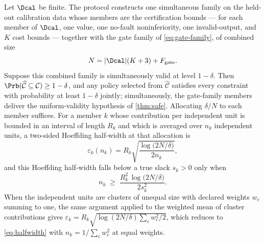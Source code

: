 \begin{proposition}
\label{prop:certification}
Let $\Dcal$ be finite.  The protocol constructs one simultaneous family on the
held-out calibration data whose members are the certification bounds --- for
each member of $\Dcal$, one value, one no-fault noninferiority, one
invalid-output, and $K$ cost bounds --- together with the gate family of
\cref{eq:gate-family}, of combined size
\begin{equation}
 N=|\Dcal|(K+3)+F_{\mathrm{gate}} .
 \label{eq:combined-family}
\end{equation}
Suppose this combined family is simultaneously valid at level $1-\delta$.  Then
$\Prb(\widehat{\mathcal C}\subseteq\mathcal C)\ge 1-\delta$, and any policy
selected from $\widehat{\mathcal C}$ satisfies every constraint with probability
at least $1-\delta$ jointly; simultaneously, the gate-family members deliver the
uniform-validity hypothesis of \cref{thm:safe}.  Allocating $\delta/N$ to each
member suffices.  For a member $k$ whose contribution per independent unit is
bounded in an interval of length $R_k$ and which is averaged over $n_k$
independent units, a two-sided Hoeffding half-width at that allocation is
\begin{equation}
 \varepsilon_k(n_k)=R_k\sqrt{\frac{\log\!\big(2N/\delta\big)}{2n_k}},
 \label{eq:halfwidth}
\end{equation}
and this Hoeffding half-width falls below a true slack $s_k>0$ only when
\begin{equation}
 n_k\;\ge\;\frac{R_k^{2}\,\log\!\big(2N/\delta\big)}{2s_k^{2}} .
 \label{eq:sample-ceiling}
\end{equation}
When the independent units are clusters of unequal size with declared weights
$w_c$ summing to one, the same argument applied to the weighted mean of cluster
contributions gives $\varepsilon_k=R_k\sqrt{\log(2N/\delta)\sum_c w_c^{2}/2}$,
which reduces to \eqref{eq:halfwidth} with $n_k=1/\sum_c w_c^2$ at equal
weights.
\end{proposition}

